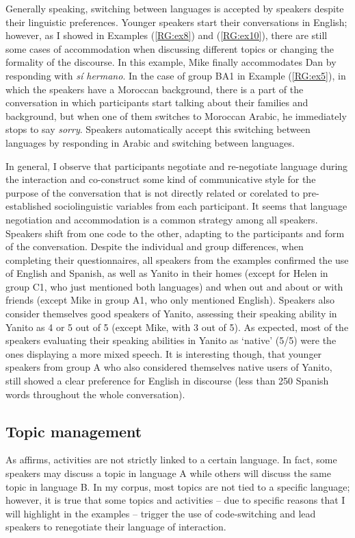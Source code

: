 \documentclass[output=paper]{langscibook}
\begin{document}
Generally speaking, switching between languages is accepted by speakers despite their linguistic preferences. Younger speakers start their conversations in English; however, as I showed in Examples (\ref{RG:ex8}) and (\ref{RG:ex10}), there are still some cases of accommodation when discussing different topics or changing the formality of the discourse. In this example, Mike finally accommodates Dan by responding with \textit{sí hermano}. In the case of group BA1 in Example (\ref{RG:ex5}), in which the speakers have a Moroccan background, there is a part of the conversation in which participants start talking about their families and background, but when one of them switches to Moroccan Arabic, he immediately stops to say \textit{sorry}. Speakers automatically accept this switching between languages by responding in Arabic and switching between languages.

In general, I observe that participants negotiate and re-negotiate language during the interaction and co-construct some kind of communicative style for the purpose of the conversation that is not directly related or corelated to pre-established sociolinguistic variables from each participant. It seems that language negotiation and accommodation is a common strategy among all speakers. Speakers shift from one code to the other, adapting to the participants and form of the conversation. Despite the individual and group differences, when completing their questionnaires, all speakers from the examples confirmed the use of English and Spanish, as well as Yanito in their homes (except for Helen in group C1, who just mentioned both languages) and when out and about or with friends (except Mike in group A1, who only mentioned English). Speakers also consider themselves good speakers of Yanito, assessing their speaking ability in Yanito as 4 or 5 out of 5 (except Mike, with 3 out of 5). As expected, most of the speakers evaluating their speaking abilities in Yanito as ‘native’ (5/5) were the ones displaying a more mixed speech. It is interesting though, that younger speakers from group A who also considered themselves native users of Yanito, still showed a clear preference for English in discourse (less than 250 Spanish words throughout the whole conversation).

\subsection{Topic management}\label{RG:sec:05_2}

As \citet{auer_postscript_2005} affirms, activities are not strictly linked to a certain language. In fact, some speakers may discuss a topic in language A while others will discuss the same topic in language B. In my corpus, most topics are not tied to a specific language; however, it is true that some topics and activities – due to specific reasons that I will highlight in the examples – trigger the use of code-switching and lead speakers to renegotiate their language of interaction. 
\end{document}
